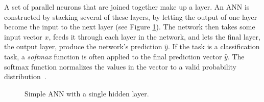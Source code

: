 A set of parallel neurons that are joined together make up a layer. An \gls{ANN} is constructed by stacking several of these layers, by letting the output of one layer become the input to the next layer (see Figure \ref{fig:ann}). The network then takes some input vector $x$, feeds it through each layer in the network, and lets the final layer, the output layer, produce the network's prediction $\hat{y}$. If the task is a classification task, a \textit{softmax} function is often applied to the final prediction vector $\hat{y}$. The softmax function normalizes the values in the vector to a valid probability distribution~\cite{deeplearningbook}.

\def\layersep{3cm}
\begin{figure}[h]
\centering
{}
\caption{Simple ANN with a single hidden layer.}
\label{fig:ann}
\end{figure}

